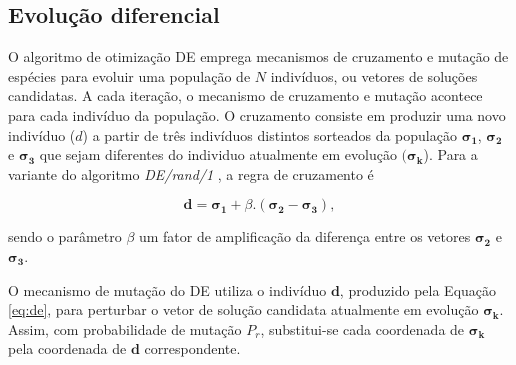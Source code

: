 \subsection{Evolução diferencial}

O algoritmo de otimização \ac{DE} \cite{Storn:1996} emprega mecanismos de cruzamento e mutação de espécies para evoluir uma população de $N$ indivíduos, ou vetores de soluções candidatas. A cada iteração, o mecanismo de cruzamento e mutação  acontece para cada indivíduo da população. O cruzamento consiste em produzir uma novo indivíduo ($d$) a partir de três indivíduos distintos sorteados da população $\boldsymbol{\sigma_1}$, $\boldsymbol{\sigma_2}$ e $\boldsymbol{\sigma_3}$ que sejam diferentes do individuo atualmente em evolução $(\boldsymbol{\sigma_k}$). Para a variante do algoritmo \emph{DE/rand/1} \cite{Storn:1996}, a regra de cruzamento é  

\noindent
\begin{equation}
\label{eq:de}
\boldsymbol{d} = \boldsymbol{\sigma_1} + \beta.(\boldsymbol{\sigma_2} - \boldsymbol{\sigma_3}),
\end{equation}

\noindent sendo o parâmetro $\beta$ um fator de amplificação da diferença entre os vetores $\boldsymbol{\sigma_2}$ e $\boldsymbol{\sigma_3}$.

O mecanismo de mutação do \ac{DE} utiliza o indivíduo $\boldsymbol{d}$, produzido pela Equação \ref{eq:de}, para perturbar o vetor de solução candidata atualmente em evolução $\boldsymbol{\sigma_k}$. Assim, com probabilidade de mutação $P_r$, substitui-se cada coordenada de $\boldsymbol{\sigma_k}$ pela coordenada de $\boldsymbol{d}$ correspondente.

